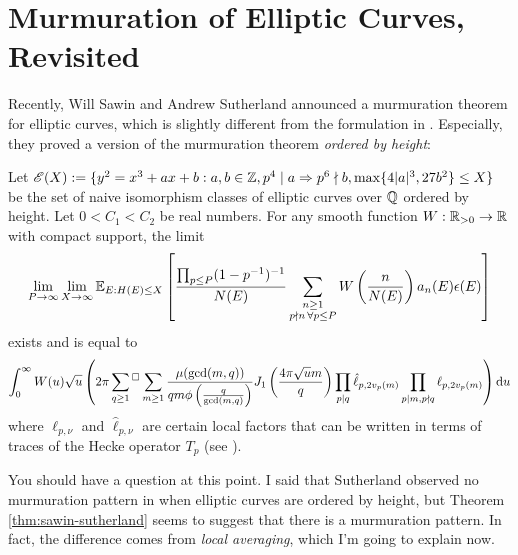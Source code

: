 \section{Murmuration of Elliptic Curves, Revisited}
\label{sec:elliptic2}

Recently, Will Sawin and Andrew Sutherland announced a murmuration theorem for elliptic curves, which is slightly different from the formulation in \cite{he2024murmurations}.
Especially, they proved a version of the murmuration theorem \emph{ordered by height}:


\begin{theorem}
    \label{thm:sawin-sutherland}
    Let $\mathscr{E}(X) := \{y^2 = x^3 + ax + b: a, b \in \mathbb{Z}, p^4 \mid a \Rightarrow p^6 \nmid b, \max\{4|a|^3, 27 b^2\} \le X\}$ be the set of naive isomorphism classes of elliptic curves over $\mathbb{Q}$ ordered by height.
    Let $0 < C_1 < C_2$ be real numbers.
    For any smooth function $W : \mathbb{R}_{>0} \to \mathbb{R}$ with compact support, the limit
    \begin{equation}
        \lim_{P \to \infty }\lim_{X \to \infty} \mathbb{E}_{E : H(E) \le X} \left[ \frac{\prod_{p \le P}(1 - p^{-1})^{-1}}{N(E)} \sum_{\substack{n \ge 1 \\ p \nmid n \,\forall p \le P}} W\left(\frac{n}{N(E)}\right) a_n(E) \epsilon(E)\right]
    \end{equation}
    exists and is equal to
    \begin{equation}
        \int_{0}^{\infty} W(u) \sqrt{u} \left(2\pi \sideset{}{{}^\square}\sum_{q \ge 1} \sum_{m \ge 1} \frac{\mu(\gcd(m,q))}{qm \phi\left(\frac{q}{\gcd(m,q)}\right)} J_1 \left(\frac{4 \pi \sqrt{u}m}{q}\right) \prod_{p \mid q} \hat{\ell}_{p, 2v_p(m)} \prod_{p \mid m, p \nmid q} \ell_{p, 2v_p(m)} \right) \mathrm{d} u
    \end{equation}
    where $\ell_{p, \nu}$ and $\hat{\ell}_{p, \nu}$ are certain local factors that can be written in terms of traces of the Hecke operator $T_p$ (see \cite[Lemma 3, 4]{sawin2025murmurations}).
\end{theorem}

You should have a question at this point.
I said that Sutherland observed no murmuration pattern in \cite{sutherlandletter} when elliptic curves are ordered by height, but Theorem \ref{thm:sawin-sutherland} seems to suggest that there is a murmuration pattern.
In fact, the difference comes from \emph{local averaging}, which I'm going to explain now.

